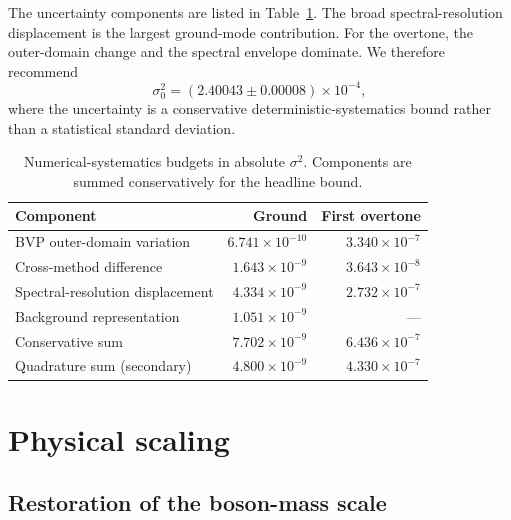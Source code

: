 \documentclass[aps,prd,preprint,onecolumn,nofootinbib,superscriptaddress,showkeys]{revtex4-2}
\newcommand{\sigmatwo}{\sigma^{2}}
\begin{document}
The uncertainty components are listed in Table~\ref{tab:uncertainty}. The broad spectral-resolution displacement is the largest ground-mode contribution. For the overtone, the outer-domain change and the spectral envelope dominate. We therefore recommend
\begin{equation}
\sigma_{0}^{2}=(2.40043\pm0.00008)\times10^{-4},
\end{equation}
where the uncertainty is a conservative deterministic-systematics bound rather than a statistical standard deviation.

\begin{table}[!htbp]
\centering
\caption{Numerical-systematics budgets in absolute $\sigmatwo$. Components are summed conservatively for the headline bound.}
\label{tab:uncertainty}
\small
\begin{tabular}{@{}lrr@{}}
\toprule
Component & Ground & First overtone \\
\midrule
BVP outer-domain variation & $6.741\times10^{-10}$ & $3.340\times10^{-7}$ \\
Cross-method difference & $1.643\times10^{-9}$ & $3.643\times10^{-8}$ \\
Spectral-resolution displacement & $4.334\times10^{-9}$ & $2.732\times10^{-7}$ \\
Background representation & $1.051\times10^{-9}$ & --- \\
\midrule
Conservative sum & $7.702\times10^{-9}$ & $6.436\times10^{-7}$ \\
Quadrature sum (secondary) & $4.800\times10^{-9}$ & $4.330\times10^{-7}$ \\
\bottomrule
\end{tabular}
\end{table}

\section{Physical scaling}\label{sec:scaling}

\subsection{Restoration of the boson-mass scale}
\end{document}
